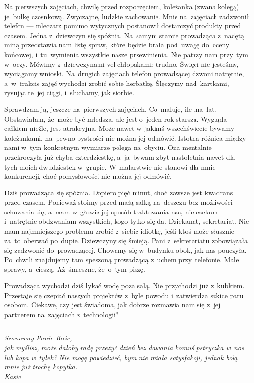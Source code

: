 \documentclass[9pt, a5paper]{memoir}
\begin{document}
Na pierwszych zajęciach, chwilę przed rozpoczęciem, koleżanka (zwana kolegą) je~bułkę czosnkową. Zwyczajne, ludzkie zachowanie. Mnie na~zajęciach zadzwonił telefon --- mleczarz pomimo wytycznych postanowił dostarczyć produkty przed czasem. Jedna z~dziewczyn się spóźnia. Na~samym starcie prowadząca z~nadętą miną przedstawia nam listę spraw, które będzie brała pod~uwagę do~oceny końcowej, i~tu~wymienia wszystkie nasze przewinienia. Nie patrzy nam przy~tym w~oczy. Mówimy z~dziewczynami vel chłopakami: trudno. Święci nie jesteśmy, wyciągamy wnioski. Na~drugich zajęciach telefon prowadzącej dzwoni natrętnie, a~w~trakcie zajęć wychodzi zrobić sobie herbatkę. Ślęczymy nad~kartkami, rysując te~jej ciągi, i~słuchamy, jak siorbie.

Sprawdzam ją, jeszcze na~pierwszych zajęciach. Co~maluje, ile ma~lat. Obstawiałam, że~może być młodsza, ale jest o~jeden rok starsza. Wygląda całkiem nieźle, jest atrakcyjna. Może nawet w~jakimś wszechświecie bywamy koleżankami, na~pewno bystrości nie można jej odmówić. Istotna różnica między nami w~tym konkretnym wymiarze polega na~obyciu. Ona mentalnie przekroczyła już chyba czterdziestkę, a~ja~bywam zbyt nastoletnia nawet dla tych moich dwudziestek w~grupie. W~malarstwie nie stanowi dla mnie konkurencji, choć pomysłowości nie można jej odmówić.

Dziś prowadząca się spóźnia. Dopiero pięć minut, choć zawsze jest kwadrans przed czasem. Ponieważ stoimy przed małą salką na~deszczu bez możliwości schowania się, a~mam w~głowie jej sposób traktowania nas, nie czekam i~natrętnie obdzwaniam wszystkich, kogo tylko się da. Dziekanat, sekretariat. Nie mam najmniejszego problemu zrobić z~siebie idiotkę, jeśli ktoś może słusznie za~to~oberwać po~dupie. Dziewczyny się śmieją. Pani z~sekretariatu zobowiązała się zadzwonić do~prowadzącej. Chowamy się w~budynku obok, jak nas pouczyła. Po~chwili znajdujemy tam speszoną prowadzącą z~uchem przy~telefonie. Małe sprawy, a~cieszą. Aż~śmieszne, że~o~tym piszę.

Prowadząca wychodzi dziś łykać wodę poza salą. Nie przychodzi już z~kubkiem. Przestaje się czepiać naszych projektów z~byle powodu i~zatwierdza szkice paru osobom. Ciekawe, czy jest świadoma, jak dobrze rozmawia nam się z~jej partnerem na~zajęciach z~technologii?

\fancybreak{* \quad * \quad *}

{
\itshape
Szanowny Panie Boże,\\
jak myślisz, może dałoby radę przeżyć dzień bez dawania komuś pstryczka w~nos lub kopa w~tyłek? Nie mogę powiedzieć, bym nie miała satysfakcji, jednak bolą mnie już trochę kopytka.\\
Kasia
}
\end{document}
